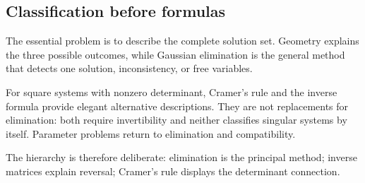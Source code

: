 \subsection{Classification before formulas}

\begin{corebox}
The essential problem is to describe the complete solution set. Geometry explains the three possible outcomes, while Gaussian elimination is the general method that detects one solution, inconsistency, or free variables.
\end{corebox}

\begin{corebox}
For square systems with nonzero determinant, Cramer's rule and the inverse formula provide elegant alternative descriptions. They are not replacements for elimination: both require invertibility and neither classifies singular systems by itself. Parameter problems return to elimination and compatibility.
\end{corebox}

The hierarchy is therefore deliberate: elimination is the principal method; inverse matrices explain reversal; Cramer's rule displays the determinant connection.
